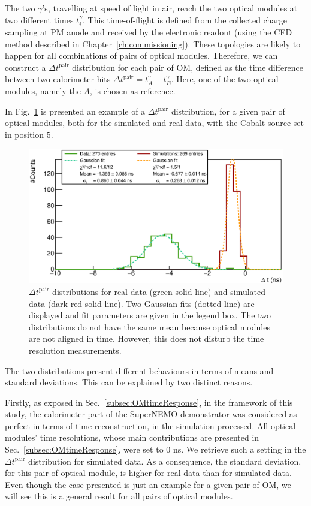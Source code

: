 The two $\gamma$'s, travelling at speed of light in air, reach the two optical modules at two different times $t^{\gamma}_{i}$.
This time-of-flight is defined from the collected charge sampling at PM anode and received by the electronic readout (using the CFD method described in Chapter~\ref{ch:commissioning}).
These topologies are likely to happen for all combinations of pairs of optical modules.
Therefore, we can construct a $\Delta t^{\text{pair}}$ distribution for each pair of OM, defined as the time difference between two calorimeter hits $\Delta t^{\text{pair}} = t^{\gamma}_{A} - t^{\gamma}_{B}$.
Here, one of the two optical modules, namely the $A$, is chosen as reference.

In Fig.~\ref{fig:Co_deltat} is presented an example of a $\Delta t^{\text{pair}}$ distribution, for a given pair of optical modules, both for the simulated and real data, with the Cobalt source set in position $5$.
\begin{figure}[h]
  \centering
  \includegraphics[width=15cm]{commissioning/fig_commissioning/Co_deltat_distrib_ex.eps}
  \caption{$\Delta t^{\text{pair}}$ distributions for real data (green solid line) and simulated data (dark red solid line).
    Two Gaussian fits (dotted line) are displayed and fit parameters are given in the legend box.
    The two distributions do not have the same mean because optical modules are not aligned in time.
    However, this does not disturb the time resolution measurements.
    \label{fig:Co_deltat}}
\end{figure}
The two distributions present different behaviours in terms of means and standard deviations.
This can be explained by two distinct reasons.

Firstly, as exposed in Sec.~\ref{subsec:OMtimeResponse}, in the framework of this study, the calorimeter part of the SuperNEMO demonstrator was considered as perfect in terms of time reconstruction, in the simulation processed.
All optical modules' time resolutions, whose main contributions are presented in Sec.~\ref{subsec:OMtimeResponse}, were set to $0$ ns.
We retrieve such a setting in the $\Delta t^{\text{pair}}$ distribution for simulated data.
As a consequence, the standard deviation, for this pair of optical module, is higher for real data than for simulated data.
Even though the case presented is just an example for a given pair of OM, we will see this is a general result for all pairs of optical modules.

